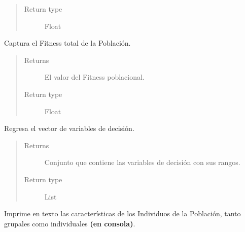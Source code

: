 \documentclass[letterpaper,10pt,english]{sphinxmanual}
\begin{document}
\begin{fulllineitems}
\begin{fulllineitems}
\begin{quote}
\begin{description}
\item[{Return type}] \leavevmode
Float

\end{description}\end{quote}

\end{fulllineitems}


\begin{fulllineitems}
\label{Model/Community/Population/Population:Model.Community.Population.Population.Population.get_total_fitness}
Captura el Fitness total de la Población.
\begin{quote}\begin{description}
\item[{Returns}] \leavevmode
El valor del Fitness poblacional.

\item[{Return type}] \leavevmode
Float

\end{description}\end{quote}

\end{fulllineitems}


\begin{fulllineitems}
\label{Model/Community/Population/Population:Model.Community.Population.Population.Population.get_vector_variables}
Regresa el vector de variables de decisión.
\begin{quote}\begin{description}
\item[{Returns}] \leavevmode
Conjunto que contiene las variables de decisión con sus rangos.

\item[{Return type}] \leavevmode
List

\end{description}\end{quote}

\end{fulllineitems}


\begin{fulllineitems}
\label{Model/Community/Population/Population:Model.Community.Population.Population.Population.print_info}
Imprime en texto las características de los Individuos
de la Población, tanto grupales como individuales \textbf{(en consola)}.


\end{fulllineitems}
\end{fulllineitems}
\end{document}
